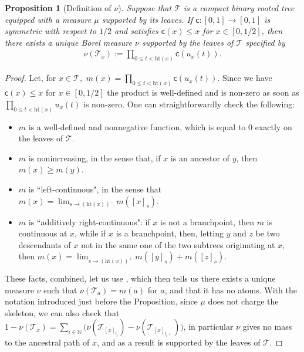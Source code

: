 \documentclass[11pt]{article}
\newcommand{\cc}{\mathsf{c}}
\newcommand{\ff}{\cc}
\newcommand{\T}{\mathcal{T}}
\renewcommand{\geq}{\geqslant}
\renewcommand{\leq}{\leqslant}
\newcommand{\h}{\mathrm{ht}}
\newtheorem{prop}[thm]{Proposition}
\begin{document}
\begin{prop}[Definition of $\nu$]\label{prop:def:nu} Suppose that $ \mathcal{T}$ is a compact binary rooted tree equipped with a measure $\mu$ supported by its leaves. If $\mathsf{c}:[0,1] \to [0,1]$ is symmetric with respect to $1/2$ and satisfies $ \mathsf{c}(x) \leq x$ for $x \in [0,1/2]$, then there exists a unique Borel measure $\nu$ supported by the leaves of $ \mathcal{T}$ specified by 
\begin{eqnarray} \nu( \T_x) := \prod_{0 \leq t < \h(x)} \ff( u_x(t)). \end{eqnarray}
\end{prop}
\begin{proof} Let, for $x\in\T,$ $m(x)=\prod_{0 \leq t < \h(x)} \ff( u_x(t)).$ Since we have $ \mathsf{c}(x) \leq x$ for $x \in [0,1/2]$ the product is well-defined and is non-zero as soon as $\prod_{0 \leq t < \h(x)}  u_x(t)$ is non-zero. One can straightforwardly check the following:
\begin{itemize}
    \item $m$ is a well-defined and nonnegative function, which is equal to $0$ exactly on the leaves of $ \mathcal{T}.$
    \item $m$ is nonincreasing, in the sense that, if $x$ is an ancestor of $y$, then $m(x)\geq m(y).$
    \item $m$ is ``left-continuous", in the sense that $\displaystyle m(x)=\lim_{s\to (\mathrm{ht}(x))^{-}} m([x]_s).$
    \item $m$ is ``additively right-continuous": if $x$ is not a branchpoint, then $m$ is continuous at $x$, while if $x$ is a branchpoint, then, letting $y$ and $z$ be two descendants of $x$ not in the same one of the two subtrees originating at $x$, then $m(x)=\displaystyle \lim_{s\to (\mathrm{ht}(x))^+} m([y]_s)+m([z]_s).$
\end{itemize}
These facts, combined, let us use \cite[Proposition 1]{Steph13}, which then tells us there exists a unique measure $\nu$ such that $\nu(\T_a)=m(a)$ for $a$, and that it has no atoms. With the notation introduced just before the Proposition, since $\mu$ does not charge the skeleton, we can also check that $1-\nu( \mathcal{T}_x) = \sum_{i \in \mathbb{N}} \big(\nu ( \mathcal{T}_{[x]_{t_i}}) -\nu ( \mathcal{T}_{[x]_{t_i +}})\big)$, in particular $\nu$ gives no mass to the ancestral path of $x$, and as a result is supported by the leaves of $ \mathcal{T}$.
\end{proof}
\end{document}
